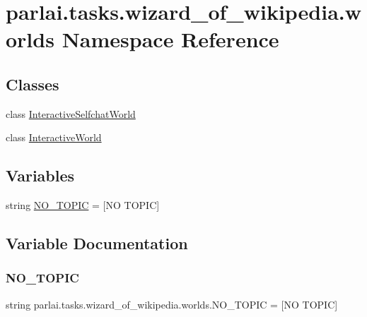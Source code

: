 \hypertarget{namespaceparlai_1_1tasks_1_1wizard__of__wikipedia_1_1worlds}{}\section{parlai.\+tasks.\+wizard\+\_\+of\+\_\+wikipedia.\+worlds Namespace Reference}
\label{namespaceparlai_1_1tasks_1_1wizard__of__wikipedia_1_1worlds}
\subsection*{Classes}
\begin{DoxyCompactItemize}
\item 
class \hyperlink{classparlai_1_1tasks_1_1wizard__of__wikipedia_1_1worlds_1_1InteractiveSelfchatWorld}{Interactive\+Selfchat\+World}
\item 
class \hyperlink{classparlai_1_1tasks_1_1wizard__of__wikipedia_1_1worlds_1_1InteractiveWorld}{Interactive\+World}
\end{DoxyCompactItemize}
\subsection*{Variables}
\begin{DoxyCompactItemize}
\item 
string \hyperlink{namespaceparlai_1_1tasks_1_1wizard__of__wikipedia_1_1worlds_a0f69c924405763d8304b2602530b1ba1}{N\+O\+\_\+\+T\+O\+P\+IC} = \textquotesingle{}\mbox{[}NO T\+O\+P\+IC\mbox{]}\textquotesingle{}
\end{DoxyCompactItemize}


\subsection{Variable Documentation}
\mbox{\label{namespaceparlai_1_1tasks_1_1wizard__of__wikipedia_1_1worlds_a0f69c924405763d8304b2602530b1ba1}} 
\subsubsection{\texorpdfstring{N\+O\+\_\+\+T\+O\+P\+IC}{NO\_TOPIC}}
{\footnotesize\ttfamily string parlai.\+tasks.\+wizard\+\_\+of\+\_\+wikipedia.\+worlds.\+N\+O\+\_\+\+T\+O\+P\+IC = \textquotesingle{}\mbox{[}NO T\+O\+P\+IC\mbox{]}\textquotesingle{}}

